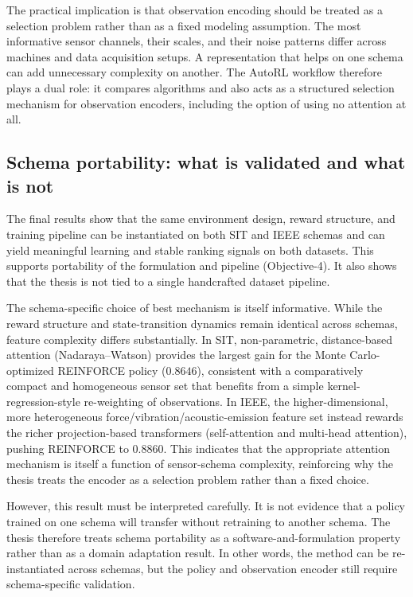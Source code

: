 \documentclass[12pt,oneside]{book}
\begin{document}
The practical implication is that observation encoding should be treated as a selection problem rather than as a fixed modeling assumption. The most informative sensor channels, their scales, and their noise patterns differ across machines and data acquisition setups. A representation that helps on one schema can add unnecessary complexity on another. The AutoRL workflow therefore plays a dual role: it compares algorithms and also acts as a structured selection mechanism for observation encoders, including the option of using no attention at all.

\subsection{Schema portability: what is validated and what is not}
The final results show that the same environment design, reward structure, and training pipeline can be instantiated on both SIT and IEEE schemas and can yield meaningful learning and stable ranking signals on both datasets. This supports portability of the formulation and pipeline (Objective-4). It also shows that the thesis is not tied to a single handcrafted dataset pipeline.

The schema-specific choice of best mechanism is itself informative. While the reward structure and state-transition dynamics remain identical across schemas, feature complexity differs substantially. In SIT, non-parametric, distance-based attention (Nadaraya--Watson) provides the largest gain for the Monte Carlo-optimized \textsc{REINFORCE} policy ($0.8646$), consistent with a comparatively compact and homogeneous sensor set that benefits from a simple kernel-regression-style re-weighting of observations. In IEEE, the higher-dimensional, more heterogeneous force/vibration/acoustic-emission feature set instead rewards the richer projection-based transformers (self-attention and multi-head attention), pushing \textsc{REINFORCE} to $0.8860$. This indicates that the appropriate attention mechanism is itself a function of sensor-schema complexity, reinforcing why the thesis treats the encoder as a selection problem rather than a fixed choice.

However, this result must be interpreted carefully. It is not evidence that a policy trained on one schema will transfer without retraining to another schema. The thesis therefore treats schema portability as a software-and-formulation property rather than as a domain adaptation result. In other words, the method can be re-instantiated across schemas, but the policy and observation encoder still require schema-specific validation.
\end{document}
